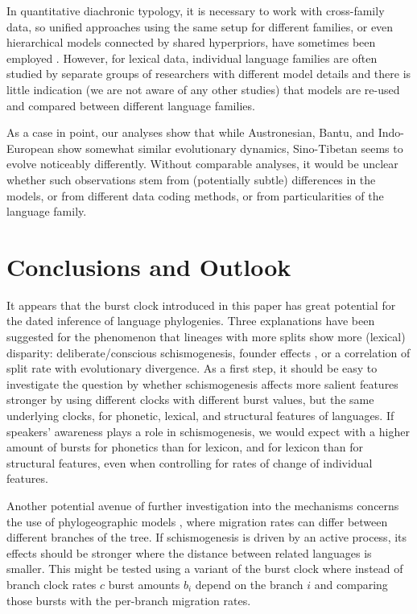 \documentclass[]{rsos}%
\begin{document}
In quantitative diachronic typology, it is necessary to work with cross-family
data, so unified approaches using the same setup for different families, or even
hierarchical models connected by shared hyperpriors, have sometimes been
employed \parencite{dunn2011evolved,jager2021phylogenetic}. However, for lexical
data, individual language families are often studied by separate groups of
researchers with different model details and there is little indication
(we are not aware of any other studies) that
models are re-used and compared between different language families.

As a case in point, our analyses show that while Austronesian, Bantu, and
Indo-European show somewhat similar evolutionary dynamics, Sino-Tibetan
seems to evolve noticeably differently. Without comparable analyses, it would be
unclear whether such observations stem from (potentially subtle)
differences in the models, or from different data coding
methods, or from particularities of the language family.

\section{Conclusions and Outlook}\label{s:conclusions}

It appears that the burst clock introduced in this paper has great potential for
the dated inference of language phylogenies. Three
explanations have been suggested for the phenomenon that lineages with more
splits show more (lexical) disparity: deliberate/conscious schismogenesis,
founder effects \parencite{atkinson2008languages,greenhill2017evolutionary},
or a correlation of split rate with evolutionary divergence.
As a first step, it should be easy to investigate the question by
\textcite{gray2013three} whether schismogenesis affects more salient features
stronger by using different clocks with different burst values, but the same
underlying clocks, for phonetic, lexical, and structural features of languages.
If speakers' awareness plays a role in schismogenesis, we would expect with
\citeauthor{gray2013three} a higher amount of bursts for phonetics than for
lexicon, and for lexicon than for structural features, even when controlling for
rates of change of individual features.

Another potential avenue of further investigation into the mechanisms
concerns the use of phylogeographic models \parencite{neureiter2021can}, where
migration rates can differ between different branches of the tree.
If schismogenesis is driven by an active process, its effects should be stronger
where the distance between related languages is smaller. This might be tested
using a variant of the burst clock where instead of branch clock rates $c$
burst amounts $b_i$ depend on the branch $i$ and comparing those bursts with the
per-branch migration rates.
\end{document}
